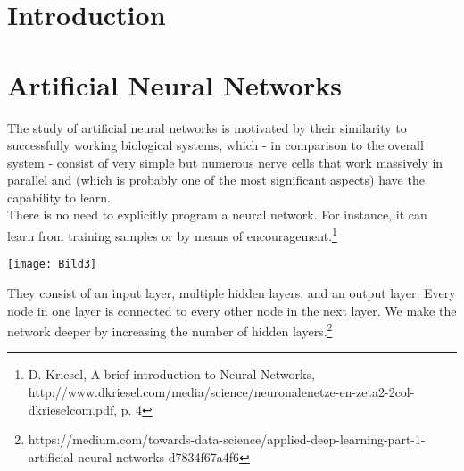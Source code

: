\documentclass[12pt]{article}
\begin{document}
\tableofcontents


 \pagebreak
 
    \section{Introduction}
  
  
  \section{Artificial Neural Networks}
  
   The study of artificial neural networks is motivated by their similarity to successfully working biological systems, which - in comparison to the overall system - consist of very simple but numerous nerve cells that work massively in parallel and (which is probably one of the most significant
   aspects) have the capability to learn.\\  
   There is no need to explicitly program a neural network. For instance, it can learn from training samples or by means of encouragement.\footnote{D. Kriesel, A brief introduction to Neural Networks, http://www.dkriesel.com/media/science/neuronalenetze-en-zeta2-2col-dkrieselcom.pdf, p. 4}\\ 
   
    \begin{center}
    	\texttt{[image: Bild3]}
    \end{center}
     
   They consist of an input layer, multiple hidden layers, and an output layer. Every node in one layer is connected to every other node in the next layer. We make the network deeper by increasing the number of hidden layers.\footnote{https://medium.com/towards-data-science/applied-deep-learning-part-1-artificial-neural-networks-d7834f67a4f6}\\
   
\end{document}
